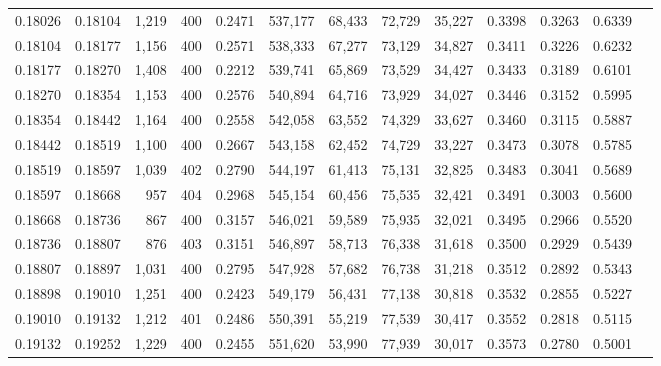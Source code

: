 \begin{tabular}{rrrrrrrrrrrrr}
0.18026 & 0.18104 &  1,219 &   400 &                                     0.2471 & 537,177 &  68,433 &  72,729 &  35,227 & 0.3398 & 0.3263 & 0.6339 \\
0.18104 & 0.18177 &  1,156 &   400 &                                     0.2571 & 538,333 &  67,277 &  73,129 &  34,827 & 0.3411 & 0.3226 & 0.6232 \\
0.18177 & 0.18270 &  1,408 &   400 &                                     0.2212 & 539,741 &  65,869 &  73,529 &  34,427 & 0.3433 & 0.3189 & 0.6101 \\
0.18270 & 0.18354 &  1,153 &   400 &                                     0.2576 & 540,894 &  64,716 &  73,929 &  34,027 & 0.3446 & 0.3152 & 0.5995 \\
0.18354 & 0.18442 &  1,164 &   400 &                                     0.2558 & 542,058 &  63,552 &  74,329 &  33,627 & 0.3460 & 0.3115 & 0.5887 \\
0.18442 & 0.18519 &  1,100 &   400 &                                     0.2667 & 543,158 &  62,452 &  74,729 &  33,227 & 0.3473 & 0.3078 & 0.5785 \\
0.18519 & 0.18597 &  1,039 &   402 &                                     0.2790 & 544,197 &  61,413 &  75,131 &  32,825 & 0.3483 & 0.3041 & 0.5689 \\
0.18597 & 0.18668 &    957 &   404 &                                     0.2968 & 545,154 &  60,456 &  75,535 &  32,421 & 0.3491 & 0.3003 & 0.5600 \\
0.18668 & 0.18736 &    867 &   400 &                                     0.3157 & 546,021 &  59,589 &  75,935 &  32,021 & 0.3495 & 0.2966 & 0.5520 \\
0.18736 & 0.18807 &    876 &   403 &                                     0.3151 & 546,897 &  58,713 &  76,338 &  31,618 & 0.3500 & 0.2929 & 0.5439 \\
0.18807 & 0.18897 &  1,031 &   400 &                                     0.2795 & 547,928 &  57,682 &  76,738 &  31,218 & 0.3512 & 0.2892 & 0.5343 \\
0.18898 & 0.19010 &  1,251 &   400 &                                     0.2423 & 549,179 &  56,431 &  77,138 &  30,818 & 0.3532 & 0.2855 & 0.5227 \\
0.19010 & 0.19132 &  1,212 &   401 &                                     0.2486 & 550,391 &  55,219 &  77,539 &  30,417 & 0.3552 & 0.2818 & 0.5115 \\
0.19132 & 0.19252 &  1,229 &   400 &                                     0.2455 & 551,620 &  53,990 &  77,939 &  30,017 & 0.3573 & 0.2780 & 0.5001 \\

\end{tabular}
